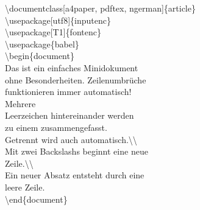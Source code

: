 \color{nounibaredI}\color{nounibaredI}\textbackslash documentclass\color{black}\color{nounibagreenI}[a4paper, pdftex, ngerman]\color{black}\{article\} \\
\color{nounibaredI}\color{nounibaredI}\textbackslash usepackage\color{black}\color{nounibagreenI}[utf8]\color{black}\{inputenc\} \\
\color{nounibaredI}\color{nounibaredI}\textbackslash usepackage\color{black}\color{nounibagreenI}[T1]\color{black}\{fontenc\} \\
\color{nounibaredI}\color{nounibaredI}\textbackslash usepackage\color{black}\{babel\} \\
\color{nounibaredI}\color{unibablueI}\textbackslash\color{unibablueI}begin\color{black}\color{black}\{document\} \\
Das ist ein einfaches Minidokument \\
ohne Besonderheiten. Zeilenumbrüche \\
funktionieren immer automatisch! \\
Mehrere \\
Leerzeichen hintereinander werden  \\
zu einem zusammengefasst. \\
Getrennt wird auch automatisch.\color{nounibaredI}\color{nounibaredI}\textbackslash \color{nounibaredI}\textbackslash \color{black} \\
Mit zwei Backslashs beginnt eine neue \\
Zeile.\color{nounibaredI}\color{nounibaredI}\textbackslash \color{nounibaredI}\textbackslash \color{black} \\
Ein neuer Absatz entsteht durch eine \\
leere Zeile. \\
\color{nounibaredI}\color{unibablueI}\textbackslash\color{unibablueI}end\color{black}\color{black}\{document\} \\

